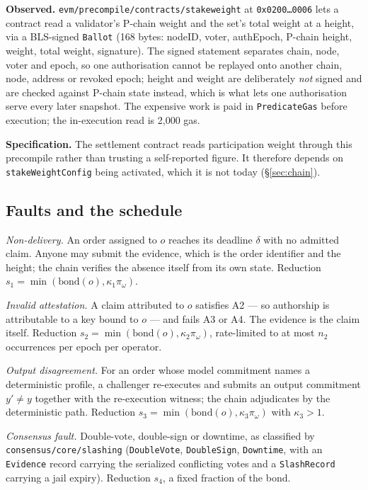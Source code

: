 \documentclass[11pt,a4paper]{article}
\theoremstyle{definition}
\theoremstyle{remark}
\newcommand{\code}[1]{\texttt{#1}}
\newcommand{\Ord}{\omega}
\begin{document}
\textbf{Observed.} \code{evm/precompile/contracts/stakeweight} at
\code{0x0200\ldots0006} lets a contract read a validator's P-chain weight and
the set's total weight at a height, via a BLS-signed \code{Ballot} (168 bytes:
nodeID, voter, authEpoch, P-chain height, weight, total weight, signature). The
signed statement separates chain, node, voter and epoch, so one authorisation
cannot be replayed onto another chain, node, address or revoked epoch; height
and weight are deliberately \emph{not} signed and are checked against P-chain
state instead, which is what lets one authorisation serve every later snapshot.
The expensive work is paid in \code{PredicateGas} before execution; the
in-execution read is 2{,}000 gas.

\textbf{Specification.} The settlement contract reads participation weight
through this precompile rather than trusting a self-reported figure. It
therefore depends on \code{stakeWeightConfig} being activated, which it is not
today (\S\ref{sec:chain}).

\subsection{Faults and the schedule}

\begin{description}[leftmargin=2.6em,style=sameline,labelwidth=2.2em]
\item[F1] \emph{Non-delivery.} An order assigned to $o$ reaches its deadline
$\delta$ with no admitted claim. Anyone may submit the evidence, which is the
order identifier and the height; the chain verifies the absence itself from its
own state. Reduction $s_1 = \min(\mathrm{bond}(o), \kappa_1 \pi_\Ord)$.
\item[F2] \emph{Invalid attestation.} A claim attributed to $o$ satisfies A2 ---
so authorship is attributable to a key bound to $o$ --- and fails A3 or A4. The
evidence is the claim itself. Reduction
$s_2 = \min(\mathrm{bond}(o), \kappa_2 \pi_\Ord)$, rate-limited to at most
$n_2$ occurrences per epoch per operator.
\item[F3] \emph{Output disagreement.} For an order whose model commitment names
a deterministic profile, a challenger re-executes and submits an output
commitment $y' \ne y$ together with the re-execution witness; the chain
adjudicates by the deterministic path. Reduction
$s_3 = \min(\mathrm{bond}(o), \kappa_3 \pi_\Ord)$ with $\kappa_3 > 1$.
\item[F4] \emph{Consensus fault.} Double-vote, double-sign or downtime, as
classified by \code{consensus/core/slashing} (\code{DoubleVote}, \code{DoubleSign},
\code{Downtime}, with an \code{Evidence} record carrying the serialized
conflicting votes and a \code{SlashRecord} carrying a jail expiry). Reduction
$s_4$, a fixed fraction of the bond.
\end{description}
\end{document}
